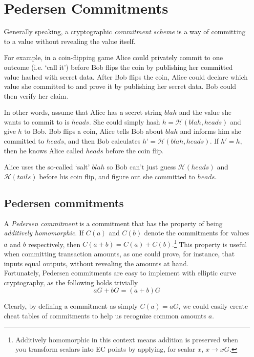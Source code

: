 \chapter{Pedersen Commitments}
\label{chapter:pedersen-commitments}


Generally speaking, a cryptographic {\em commitment scheme} is a way of committing to a value without revealing the value itself.

For example, in a coin-flipping game Alice could privately commit to one outcome (i.e. ‘call it’) before Bob flips the coin by publishing her committed value hashed with secret data. After Bob flips the coin, Alice could declare which value she committed to and prove it by publishing her secret data. Bob could then verify her claim.

In other words, assume that Alice has a secret string $blah$ and the value she wants to commit to is $heads$. She could simply hash $h = \mathcal{H}(blah, heads)$ and give $h$ to Bob. Bob flips a coin, Alice tells Bob about $blah$ and informs him she committed to $heads$, and then Bob calculates $h’ = \mathcal{H}(blah, heads)$. If $h' = h$, then he knows Alice called $heads$ before the coin flip.

Alice uses the so-called `salt' $blah$ so Bob can't just guess $\mathcal{H}(heads)$ and $\mathcal{H}(tails)$ before his coin flip, and figure out she committed to $heads$.

\section{Pedersen commitments}
\label{pedersen_section}

A {\em Pedersen commitment} \cite{Pedersen1992} is a commitment that has the property of being {\em additively homomorphic}. If \(C(a)\) and \(C(b)\) denote the commitments for values \(a\) and \(b\) respectively, then \(C(a + b) = C(a) + C(b)\).\footnote{Additively homomorphic in this context means addition is preserved when you transform scalars into EC points by applying, for scalar $x$, $x \rightarrow x G$.} This property is useful when committing transaction amounts, as one could prove, for instance, that inputs equal outputs, without revealing the amounts at hand.
\\

Fortunately, Pedersen commitments are easy to implement with elliptic curve cryptography, as the following holds trivially \[a G + b G = (a + b) G\]

Clearly, by defining a commitment as simply \(C(a) = a G\), we could easily create cheat tables of commitments to help us recognize common amounts $a$.

